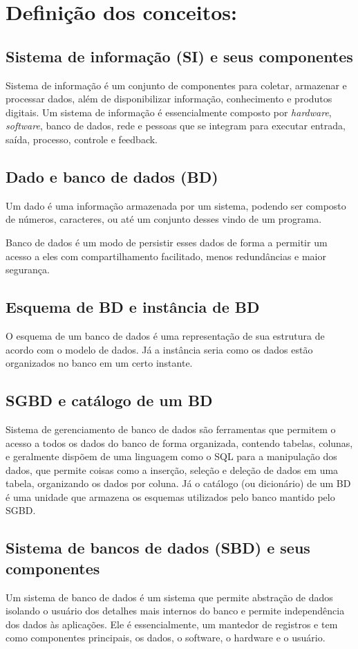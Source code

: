 \documentclass[12pt]{article}
\begin{document}
\section{Definição dos conceitos:}

\subsection{Sistema de informação (SI) e seus componentes}
Sistema de informação é um conjunto de componentes para coletar, armazenar e processar dados, além de disponibilizar informação, conhecimento e produtos digitais.
Um sistema de informação é essencialmente composto por \textit{hardware}, \textit{software}, banco de dados, rede e pessoas que se integram para executar entrada, saída, processo, controle e feedback.

\subsection{Dado e banco de dados (BD)}
Um dado é uma informação armazenada por um sistema, podendo ser composto de números, caracteres, ou até um conjunto desses vindo de um programa.

Banco de dados é um modo de persistir esses dados de forma a permitir um acesso a eles com compartilhamento facilitado, menos redundâncias e maior segurança.

\subsection{Esquema de BD e instância de BD}
O esquema de um banco de dados é uma representação de sua estrutura de acordo com o modelo de dados.
Já a instância seria como os dados estão organizados no banco em um certo instante.

\subsection{SGBD e catálogo de um BD}
Sistema de gerenciamento de banco de dados são ferramentas que permitem o acesso a todos os dados do banco de forma organizada, contendo tabelas, colunas, e geralmente dispõem de uma linguagem como o SQL para a manipulação dos dados,
que permite coisas como a inserção, seleção e deleção de dados em uma tabela, organizando os dados por coluna.
Já o catálogo (ou dicionário) de um BD é uma unidade que armazena os esquemas utilizados pelo banco mantido pelo SGBD.

\subsection{Sistema de bancos de dados (SBD) e seus componentes}
Um sistema de banco de dados é um sistema que permite abstração de dados isolando o usuário dos detalhes mais internos do banco e permite independência dos dados às aplicações.
Ele é essencialmente, um mantedor de registros e tem como componentes principais, os dados, o software, o hardware e o usuário.
\end{document}
